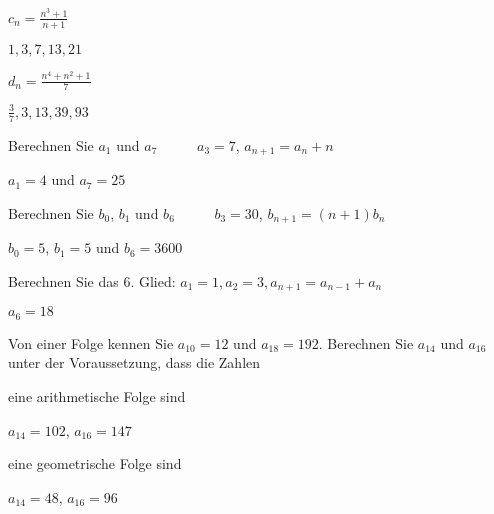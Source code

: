 \begin{exercisesK}
\begin{exercise}
\begin{answer}
\end{answer}
\end{exercise}
\begin{exercise}  $c_{n} = \frac{n^{3}+1}{n+1}$\begin{answer}  $1,3,7,13,21$
\end{answer}
\end{exercise}
\begin{exercise}  $d_{n} = \frac{n^{4}+n^{2}+1}{7}$\begin{answer}  $\frac{3}{7},3,13,39,93$
\end{answer}
\end{exercise}

\endtwocol

\begin{exercise} Berechnen Sie $a_{1}$ und $a_{7}$ \ \ \ \ \ $a_{3}=7$, $a_{n+1}=a_{n}+n$\begin{answer}  $a_{1}=4$ und $a_{7}=25$
\end{answer}
\end{exercise}

\begin{exercise} Berechnen Sie $b_{0}$, $b_{1}$ und $b_{6}$ \ \ \ \ \ $b_{3} = 30$, $b_{n+1}=(n+1)b_{n}$\begin{answer}  $b_{0}=5$, $b_{1}=5$ und $b_{6}=3600$
\end{answer}
\end{exercise}

\begin{exercise}Berechnen Sie das 6. Glied:
$a_{1} = 1, a_{2} = 3, a_{n+1}= a_{n-1} + a_{n}$ \begin{answer}  $a_{6}=18$
\end{answer}
\end{exercise}

Von einer Folge kennen Sie $a_{10}=12$ und $a_{18}=192$. Berechnen Sie $a_{14}$ und $a_{16}$ unter der Voraussetzung, dass die Zahlen
\twocol
\begin{exercise} eine arithmetische Folge sind \begin{answer} $a_{14}= 102$, $a_{16}=147$
\end{answer}
\end{exercise}

\begin{exercise} eine geometrische Folge sind \begin{answer} $a_{14}= 48$, $a_{16}=96$
\end{answer}
\end{exercise}



\end{exercisesK}
